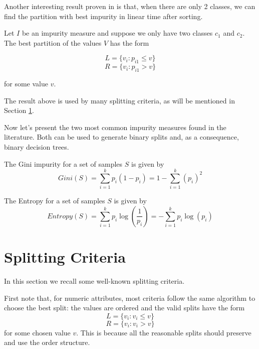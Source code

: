 Another interesting result proven in \cite{Breiman84} is that, when there are only 2 classes, we can find the partition with best impurity in linear time after sorting.

\begin{theorem}
\label{thm:two-class-trick}
Let $I$ be an impurity measure and suppose we only have two classes $c_1$ and $c_2$. The best partition of the values $V$ has the form

$$L = \{v_i : p_{i1} \leq v\}$$
$$R = \{v_i : p_{i1} > v\}$$

for some value $v$.
\end{theorem}

The result above is used by many splitting criteria, as will be mentioned in Section \ref{sec:splitting-criteria}.

Now let's present the two most common impurity measures found in the literature. Both can be used to generate binary splits and, as a consequence, binary decision trees.

\begin{definition}
\label{def:Gini}
The Gini impurity for a set of samples $S$ is given by 
\begin{equation}
 Gini(S) =  \sum_{i=1}^k p_i(1 - p_i) = 1 - \sum_{i=1}^k (p_i)^2
\label{eq:gini}
\end{equation}
\end{definition}

\begin{definition}
The Entropy for a set of samples $S$ is given by 
\begin{equation}
 Entropy(S) = \sum_{i=1}^k p_i \log\left(\frac{1}{p_i}\right)  = - \sum_{i=1}^k p_i \log(p_i)
\label{eq:entropy}
\end{equation}
\end{definition}

\section{Splitting Criteria}
\label{sec:splitting-criteria}
In this section we recall some well-known splitting criteria.

First note that, for numeric attributes, most criteria follow the same algorithm to choose the best split: the values are ordered and the valid splits have the form 
$$L = \{v_i : v_i \leq v\}$$
$$R = \{v_i : v_i > v\}$$
for some chosen value $v$. This is because all the reasonable splits should preserve and use the order structure.

